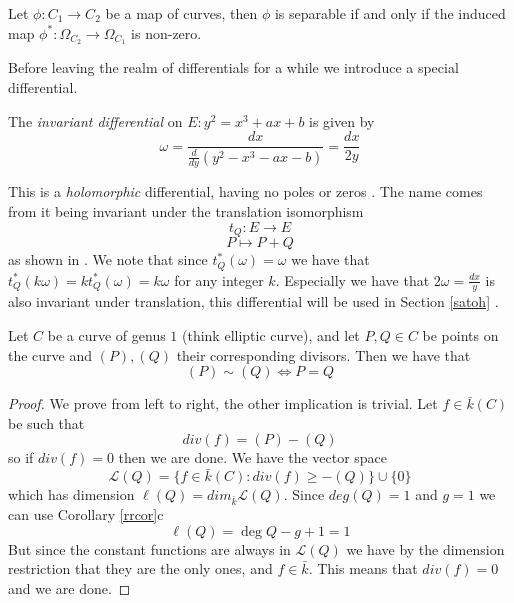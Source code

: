 \begin{prop} \label{diffsep}
 Let $\phi: C_1 \rightarrow C_2$ be a map of curves, then $\phi$ is separable if and only if
the induced map $\phi^*: \Omega_{C_2} \rightarrow \Omega_{C_1} $ is non-zero.
\end{prop}

Before leaving the realm of differentials for a while we introduce a special differential.
\begin{mydef}
The \emph{invariant differential} on $E: y^2 = x^3 + ax + b$ is given by
$$\omega = \frac{dx}{\frac{d}{dy}\left(y^2 - x^3  - ax - b\right)} = \frac{dx}{2y} $$
\end{mydef}
This is a \emph{holomorphic} differential, having no poles or zeros \cite{AEC}. The name comes from it
being invariant under the translation isomorphism
$$ t_Q: E \rightarrow E$$
$$ P \mapsto P + Q$$
as shown in \cite{AEC}. We note that since $t_Q^*(\omega) = \omega$ we have that
$t_Q^*(k\omega) = k t_Q^*(\omega) = k\omega$ for any integer $k$. Especially we have that
$2\omega = \frac{dx}{y}$ is also invariant under translation, this differential will be used
in Section \ref{satoh} \label{invariant}.

\begin{prop} \label{3.3}
 Let $C$ be a curve of genus $1$ (think elliptic curve), and let $P,Q\in C$ be points on the curve and
$(P), (Q)$ their corresponding divisors. Then we have that
$$ (P) \sim (Q) \iff P = Q $$
\end{prop}
\begin{proof}
 We prove from left to right, the other implication is trivial. Let $f\in \bar{k}(C)$ be such that
$$ div(f) = (P)-(Q) $$
so if $div(f) = 0$ then we are done. We have the vector space
$$ \mathscr{L}(Q) = \{ f\in \bar{k}(C) : div(f) \geq -(Q) \} \cup \{ 0 \} $$
which has dimension $\ell(Q) = dim_{\bar{k}} \mathscr{L}(Q)$. Since $deg(Q) = 1$ and $g = 1$
we can use Corollary \ref{rrcor}c 
$$\ell(Q) = \deg Q - g + 1 = 1$$
But since the constant functions are always in $\mathscr{L}(Q)$ we have by the dimension restriction that
they are the only ones, and $f \in \bar{k}$. This means that $div(f) = 0$ and we are done.
\end{proof}

